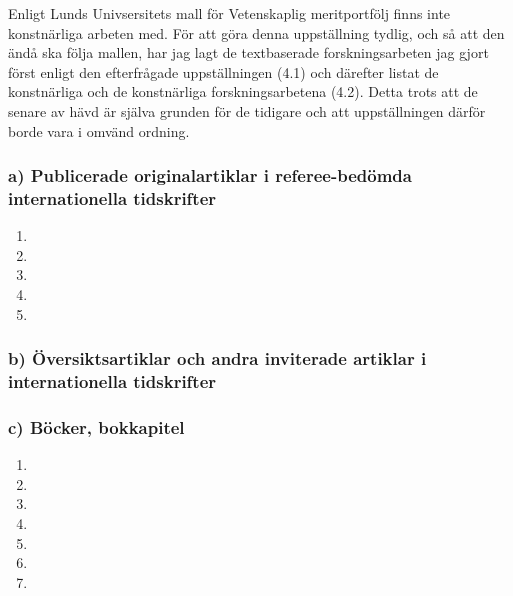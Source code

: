Enligt Lunds Univsersitets mall för Vetenskaplig meritportfölj finns inte konstnärliga arbeten med. För att göra denna uppställning tydlig, och så att den ändå ska följa mallen, har jag lagt de textbaserade forskningsarbeten jag gjort först enligt den efterfrågade uppställningen (4.1) och därefter listat de konstnärliga och de konstnärliga forskningsarbetena (4.2). Detta trots att de senare av hävd är själva grunden för de tidigare och att uppställningen därför borde vara i omvänd ordning.

\subsubsection*{\textsf{a) Publicerade originalartiklar i referee-bedömda internationella tidskrifter}}


\begin{enumerate}
\item {}

\item  {}

\item  {}

\item  {}

\item  {}
\end{enumerate}


\subsubsection*{\textsf{b) Översiktsartiklar och andra inviterade artiklar i internationella tidskrifter}}
\subsubsection*{\textsf{c) Böcker, bokkapitel}}


\begin{enumerate}
\item {}

\item   {}

\item   {}

\item   {}

\item   {}

\item   {}

 \item  {}
\end{enumerate}


